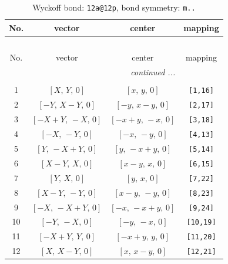 \documentclass[fleqn,8pt]{jsarticle}
\begin{document}
\begin{longtable}{cccc}
\caption{Wyckoff bond: {\tt 12a@12p}, bond symmetry: {\tt m..}}
 \\
 \hline \hline
No. & vector & center & mapping \\ \hline \endfirsthead

\multicolumn{3}{l}{\tablename\ \thetable{}} \\
 \hline \hline
No. & vector & center & mapping \\ \hline \endhead

 \hline \hline
\multicolumn{3}{r}{\footnotesize\it continued ...} \\ \endfoot

 \hline \hline
\multicolumn{3}{r}{} \\ \endlastfoot

1 & $\left[ X,\, Y,\, 0 \right]$ & $\left[ x,\, y,\, 0 \right]$ & {\tt [1,16]} \\ \hline
2 & $\left[ - Y,\, X - Y,\, 0 \right]$ & $\left[ - y,\, x - y,\, 0 \right]$ & {\tt [2,17]} \\ \hline
3 & $\left[ - X + Y,\, - X,\, 0 \right]$ & $\left[ - x + y,\, - x,\, 0 \right]$ & {\tt [3,18]} \\ \hline
4 & $\left[ - X,\, - Y,\, 0 \right]$ & $\left[ - x,\, - y,\, 0 \right]$ & {\tt [4,13]} \\ \hline
5 & $\left[ Y,\, - X + Y,\, 0 \right]$ & $\left[ y,\, - x + y,\, 0 \right]$ & {\tt [5,14]} \\ \hline
6 & $\left[ X - Y,\, X,\, 0 \right]$ & $\left[ x - y,\, x,\, 0 \right]$ & {\tt [6,15]} \\ \hline
7 & $\left[ Y,\, X,\, 0 \right]$ & $\left[ y,\, x,\, 0 \right]$ & {\tt [7,22]} \\ \hline
8 & $\left[ X - Y,\, - Y,\, 0 \right]$ & $\left[ x - y,\, - y,\, 0 \right]$ & {\tt [8,23]} \\ \hline
9 & $\left[ - X,\, - X + Y,\, 0 \right]$ & $\left[ - x,\, - x + y,\, 0 \right]$ & {\tt [9,24]} \\ \hline
10 & $\left[ - Y,\, - X,\, 0 \right]$ & $\left[ - y,\, - x,\, 0 \right]$ & {\tt [10,19]} \\ \hline
11 & $\left[ - X + Y,\, Y,\, 0 \right]$ & $\left[ - x + y,\, y,\, 0 \right]$ & {\tt [11,20]} \\ \hline
12 & $\left[ X,\, X - Y,\, 0 \right]$ & $\left[ x,\, x - y,\, 0 \right]$ & {\tt [12,21]} \\
\end{longtable}
\renewcommand{\arraystretch}{1.2}
\end{document}
